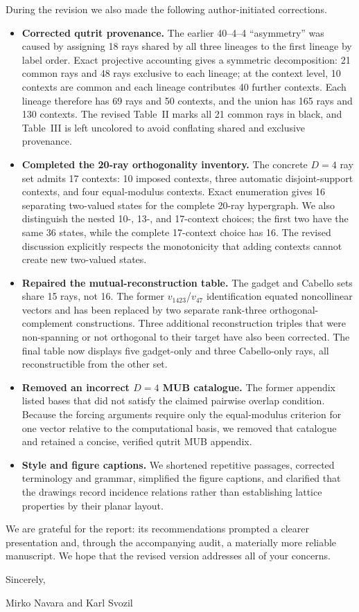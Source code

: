\documentclass[11pt]{article}
\begin{document}
During the revision we also made the following author-initiated corrections.

\begin{itemize}
\item \textbf{Corrected qutrit provenance.}  The earlier 40--4--4 ``asymmetry'' was caused by assigning 18 rays shared by all three lineages to the first lineage by label order.  Exact projective accounting gives a symmetric decomposition: 21 common rays and 48 rays exclusive to each lineage; at the context level, 10 contexts are common and each lineage contributes 40 further contexts.  Each lineage therefore has 69 rays and 50 contexts, and the union has 165 rays and 130 contexts.  The revised Table~II marks all 21 common rays in black, and Table~III is left uncolored to avoid conflating shared and exclusive provenance.

\item \textbf{Completed the 20-ray orthogonality inventory.}  The concrete $D=4$ ray set admits 17 contexts: 10 imposed contexts, three automatic disjoint-support contexts, and four equal-modulus contexts.  Exact enumeration gives 16 separating two-valued states for the complete 20-ray hypergraph.  We also distinguish the nested 10-, 13-, and 17-context choices; the first two have the same 36 states, while the complete 17-context choice has 16.  The revised discussion explicitly respects the monotonicity that adding contexts cannot create new two-valued states.

\item \textbf{Repaired the mutual-reconstruction table.}  The gadget and Cabello sets share 15 rays, not 16.  The former $v_{1423}$/$v_{47}$ identification equated noncollinear vectors and has been replaced by two separate rank-three orthogonal-complement constructions.  Three additional reconstruction triples that were non-spanning or not orthogonal to their target have also been corrected.  The final table now displays five gadget-only and three Cabello-only rays, all reconstructible from the other set.

\item \textbf{Removed an incorrect $D=4$ MUB catalogue.}  The former appendix listed bases that did not satisfy the claimed pairwise overlap condition.  Because the forcing arguments require only the equal-modulus criterion for one vector relative to the computational basis, we removed that catalogue and retained a concise, verified qutrit MUB appendix.

\item \textbf{Style and figure captions.}  We shortened repetitive passages, corrected terminology and grammar, simplified the figure captions, and clarified that the drawings record incidence relations rather than establishing lattice properties by their planar layout.
\end{itemize}

We are grateful for the report: its recommendations prompted a clearer presentation and, through the accompanying audit, a materially more reliable manuscript.  We hope that the revised version addresses all of your concerns.

Sincerely,

Mirko Navara and Karl Svozil
\end{document}

